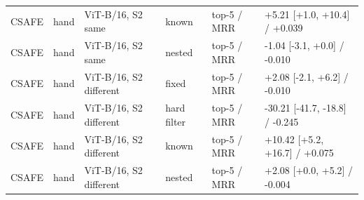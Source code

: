 \documentclass[10pt,a4paper]{article}
\begin{document}
{\begin{longtable}{llllll}
CSAFE & hand & ViT-B/16, S2 same & known & top-5 / MRR & +5.21 [+1.0, +10.4] / +0.039 \\
CSAFE & hand & ViT-B/16, S2 same & nested & top-5 / MRR & -1.04 [-3.1, +0.0] / -0.010 \\
CSAFE & hand & ViT-B/16, S2 different & fixed & top-5 / MRR & +2.08 [-2.1, +6.2] / -0.010 \\
CSAFE & hand & ViT-B/16, S2 different & hard filter & top-5 / MRR & -30.21 [-41.7, -18.8] / -0.245 \\
CSAFE & hand & ViT-B/16, S2 different & known & top-5 / MRR & +10.42 [+5.2, +16.7] / +0.075 \\
CSAFE & hand & ViT-B/16, S2 different & nested & top-5 / MRR & +2.08 [+0.0, +5.2] / -0.004 \\
\bottomrule
\end{longtable}
}
\end{document}
